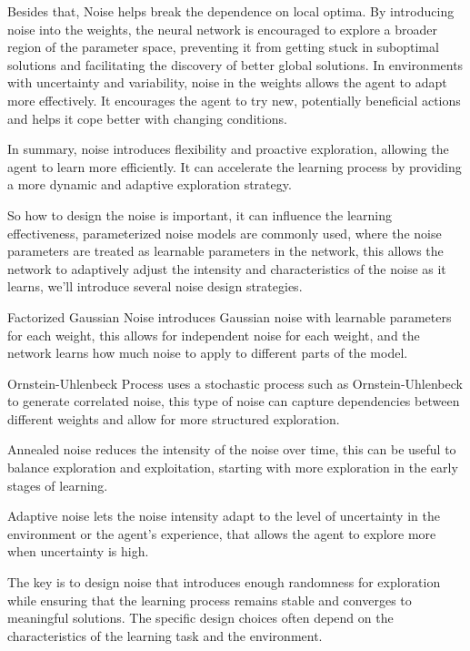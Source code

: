 \documentclass{article}
\begin{document}
 Besides that, Noise helps break the dependence on local optima. By introducing noise into the weights, the neural network is encouraged to explore a broader region of the parameter space, preventing it from getting stuck in suboptimal solutions and facilitating the discovery of better global solutions. In environments with uncertainty and variability, noise in the weights allows the agent to adapt more effectively. It encourages the agent to try new, potentially beneficial actions and helps it cope better with changing conditions.

 In summary, noise introduces flexibility and proactive exploration, allowing the agent to learn more efficiently. It can accelerate the learning process by providing a more dynamic and adaptive exploration strategy.
 
 So how to design the noise is important, it can influence the learning effectiveness, parameterized noise models are commonly used, where the noise parameters are treated as learnable parameters in the network, this allows the network to adaptively adjust the intensity and characteristics of the noise as it learns, we'll introduce several noise design strategies.
 
 Factorized Gaussian Noise introduces Gaussian noise with learnable parameters for each weight, this allows for independent noise for each weight, and the network learns how much noise to apply to different parts of the model.

 Ornstein-Uhlenbeck Process uses a stochastic process such as Ornstein-Uhlenbeck to generate correlated noise, this type of noise can capture dependencies between different weights and allow for more structured exploration.

 Annealed noise reduces the intensity of the noise over time, this can be useful to balance exploration and exploitation, starting with more exploration in the early stages of learning.

 Adaptive noise lets the noise intensity adapt to the level of uncertainty in the environment or the agent's experience, that allows the agent to explore more when uncertainty is high.

 The key is to design noise that introduces enough randomness for exploration while ensuring that the learning process remains stable and converges to meaningful solutions. The specific design choices often depend on the characteristics of the learning task and the environment.


\hspace*{\fill}
\end{document}
